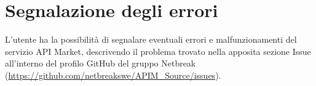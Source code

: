 \newpage
\section{Segnalazione degli errori}


L'utente ha la possibilità di segnalare eventuali errori e malfunzionamenti del servizio API Market, descrivendo il problema trovato nella apposita sezione Issue all'interno del profilo GitHub del gruppo Netbreak (\url{https://github.com/netbreakswe/APIM_Source/issues}).